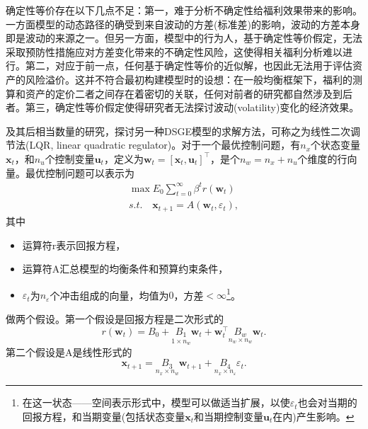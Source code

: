 确定性等价存在以下几点不足：第一，难于分析不确定性给福利效果带来的影响。一方面模型的动态路径的确受到来自波动的方差(标准差)的影响，波动的方差本身即是波动的来源之一。但另一方面，模型中的行为人，基于确定性等价假定，无法采取预防性措施应对方差变化带来的不确定性风险，这使得相关福利分析难以进行。第二，对应于前一点，任何基于确定性等价的近似解，也因此无法用于评估资产的风险溢价。这并不符合最初构建模型时的设想：在一般均衡框架下，福利的测算和资产的定价二者之间存在着密切的关联，任何对前者的研究都自然涉及到后者\citep{Alvarez:2004ix}。第三，确定性等价假定使得研究者无法探讨波动(volatility)变化的经济效果。

\begin{remark}
  \cite{Kydland:1982cd}及其后相当数量的研究，探讨另一种DSGE模型的求解方法，可称之为线性二次调节法(LQR, linear quadratic regulator)。对于一个最优控制问题，有$n_x$个状态变量$\bm{x}_t$，和$n_{u}$个控制变量$\bm{u}_t$，定义为$\bm{w}_t = \left[\bm{x}_t, \bm{u}_t\right]^{\top}$，是个$n_w = n_x + n_u$个维度的行向量。最优控制问题可以表示为
  \begin{equation*}
    \begin{split}
      \max E_0 \sum_{t=0}^{\infty} \beta^t r(\bm{w}_t) \\
      s.t. \quad \bm{x}_{t+1} = A(\bm{w}_t, \varepsilon_t),
    \end{split}
  \end{equation*}
其中
\begin{itemize}
  \item 运算符r表示回报方程，
  \item 运算符A汇总模型的均衡条件和预算约束条件，
  \item $\varepsilon_t$为$n_{\varepsilon}$个冲击组成的向量，均值为$0$，方差$< \infty$\footnote{在这一状态——空间表示形式中，模型可以做适当扩展，以使$\varepsilon_{t}$也会对当期的回报方程，和当期变量(包括状态变量$\bm{x}_t$和当期控制变量$\bm{u}_t$在内)产生影响。}。
\end{itemize}

做两个假设。第一个假设是回报方程是二次形式的
\begin{equation*}
  r(\bm{w}_t) = B_0 + \underset{1 \times n_w}{B_1} \bm{w}_t + \bm{w}_t^{\top} \underset{n_w \times n_w}{B_w} \bm{w}_t.
\end{equation*}
第二个假设是A是线性形式的
\begin{equation*}
  \bm{x}_{t+1} = \underset{n_x \times n_w}{B_3} \bm{w}_{t+1} + \underset{n_x \times n_{\varepsilon}}{B_4} \varepsilon_t.
\end{equation*}


\end{remark}
